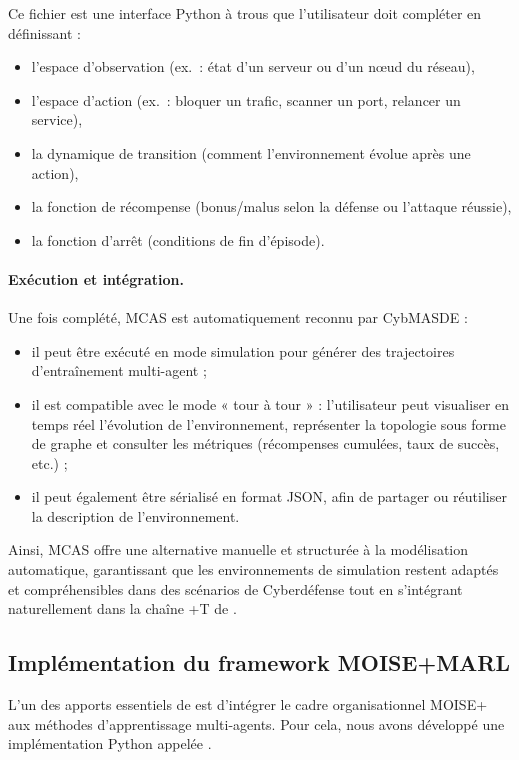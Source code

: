 Ce fichier est une interface Python à trous que l'utilisateur doit compléter en définissant :
\begin{itemize}
  \item l'espace d'observation (ex.~: état d'un serveur ou d'un nœud du réseau),
  \item l'espace d'action (ex.~: bloquer un trafic, scanner un port, relancer un service),
  \item la dynamique de transition (comment l'environnement évolue après une action),
  \item la fonction de récompense (bonus/malus selon la défense ou l'attaque réussie),
  \item la fonction d'arrêt (conditions de fin d'épisode).
\end{itemize}

\paragraph{Exécution et intégration.}
Une fois complété, MCAS est automatiquement reconnu par CybMASDE :
\begin{itemize}
  \item il peut être exécuté en mode simulation pour générer des trajectoires d'entraînement multi-agent ;
  \item il est compatible avec le mode « tour à tour » : l'utilisateur peut visualiser en temps réel l'évolution de l'environnement, représenter la topologie sous forme de graphe et consulter les métriques (récompenses cumulées, taux de succès, etc.) ;
  \item il peut également être sérialisé en format JSON, afin de partager ou réutiliser la description de l'environnement.
\end{itemize}

Ainsi, MCAS offre une alternative manuelle et structurée à la modélisation automatique, garantissant que les environnements de simulation restent adaptés et compréhensibles dans des scénarios de Cyberdéfense tout en s'intégrant naturellement dans la chaîne +T de .


\subsection{Implémentation du framework MOISE+MARL}

L'un des apports essentiels de \footnotemark[1] est d'intégrer le cadre organisationnel MOISE+ aux méthodes d'apprentissage multi-agents. Pour cela, nous avons développé une implémentation Python appelée \footnotemark[2].

